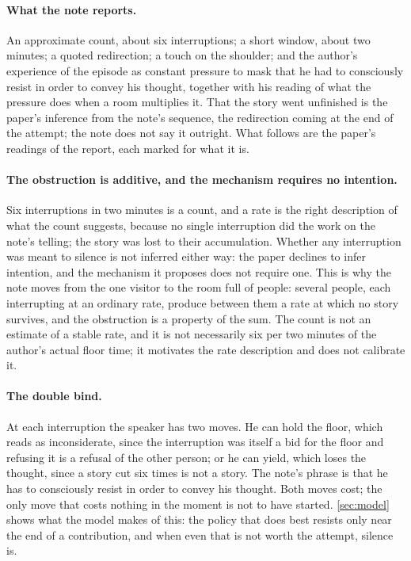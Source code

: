 \paragraph{What the note reports.} An approximate count, about six interruptions; a short window, about two minutes; a quoted redirection; a touch on the shoulder; and the author's experience of the episode as constant pressure to mask that he had to consciously resist in order to convey his thought, together with his reading of what the pressure does when a room multiplies it. That the story went unfinished is the paper's inference from the note's sequence, the redirection coming at the end of the attempt; the note does not say it outright. What follows are the paper's readings of the report, each marked for what it is.

\paragraph{The obstruction is additive, and the mechanism requires no intention.} Six interruptions in two minutes is a count, and a rate is the right description of what the count suggests, because no single interruption did the work on the note's telling; the story was lost to their accumulation. Whether any interruption was meant to silence is not inferred either way: the paper declines to infer intention, and the mechanism it proposes does not require one. This is why the note moves from the one visitor to the room full of people: several people, each interrupting at an ordinary rate, produce between them a rate at which no story survives, and the obstruction is a property of the sum. The count is not an estimate of a stable rate, and it is not necessarily six per two minutes of the author's actual floor time; it motivates the rate description and does not calibrate it.

\paragraph{The double bind.} At each interruption the speaker has two moves. He can hold the floor, which reads as inconsiderate, since the interruption was itself a bid for the floor and refusing it is a refusal of the other person; or he can yield, which loses the thought, since a story cut six times is not a story. The note's phrase is that he has to consciously resist in order to convey his thought. Both moves cost; the only move that costs nothing in the moment is not to have started. \autoref{sec:model} shows what the model makes of this: the policy that does best resists only near the end of a contribution, and when even that is not worth the attempt, silence is.

